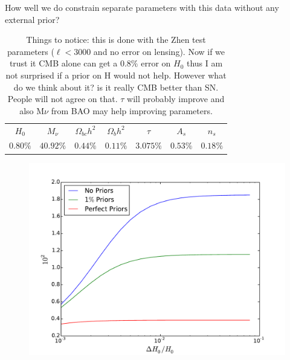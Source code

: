 \documentclass[aps,prd,preprint,groupedaddress]{revtex4-1}
\begin{document}
\begin{table}[htdp]
\caption{How well we do constrain separate parameters with this data without any external prior?}
\begin{center}
\begin{tabular}{|c|c|c|c|c|c|c|}
\hline
$H_{0}$ &$ M_{\nu}$ &$\Omega_{bc}h^{2}$&$\Omega_{b}h^{2}$&$\tau$&$A_{s}$&$n_{s}$ \\
$0.80 \%$&$40.92\%$&$0.44\%$&$0.11\%$&$3.075\%$&$0.53\%$&$0.18\%$\\

\hline


\end{tabular}
\end{center}
\label{default}
\caption{Things to notice: this is done with the Zhen test parameters ($\ell<3000$ and no error on lensing). Now if we trust it CMB alone can get a $0.8\%$ error on $H_{0}$ thus I am not surprised if a prior on H would not help. However what do we think about it? is it really CMB better than SN. People will not agree on that. $\tau$ will probably improve and also M$\nu$ from BAO may help improving parameters.}
\end{table}%


\begin{figure}[htbp]
\begin{center}
\includegraphics[scale=0.6]{h0_fisher.pdf}
\caption{}
\label{fig:phi-cl-noise}
\end{center}
\end{figure}
\end{document}
